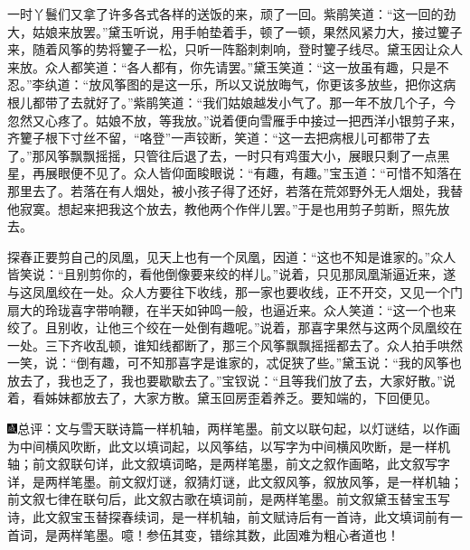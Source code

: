 一时丫鬟们又拿了许多各式各样的送饭的来，顽了一回。紫鹃笑道：``这一回的劲大，姑娘来放罢。''黛玉听说，用手帕垫着手，顿了一顿，果然风紧力大，接过籰子来，随着风筝的势将籰子一松，只听一阵豁刺刺响，登时籰子线尽。黛玉因让众人来放。众人都笑道：``各人都有，你先请罢。''黛玉笑道：``这一放虽有趣，只是不忍。''李纨道：``放风筝图的是这一乐，所以又说放晦气，你更该多放些，把你这病根儿都带了去就好了。''紫鹃笑道：``我们姑娘越发小气了。那一年不放几个子，今忽然又心疼了。姑娘不放，等我放。''说着便向雪雁手中接过一把西洋小银剪子来，齐籰子根下寸丝不留，``咯登''一声铰断，笑道：``这一去把病根儿可都带了去了。''那风筝飘飘摇摇，只管往后退了去，一时只有鸡蛋大小，展眼只剩了一点黑星，再展眼便不见了。众人皆仰面睃眼说：``有趣，有趣。''宝玉道：``可惜不知落在那里去了。若落在有人烟处，被小孩子得了还好，若落在荒郊野外无人烟处，我替他寂寞。想起来把我这个放去，教他两个作伴儿罢。''于是也用剪子剪断，照先放去。

探春正要剪自己的凤凰，见天上也有一个凤凰，因道：``这也不知是谁家的。''众人皆笑说：``且别剪你的，看他倒像要来绞的样儿。''说着，只见那凤凰渐逼近来，遂与这凤凰绞在一处。众人方要往下收线，那一家也要收线，正不开交，又见一个门扇大的玲珑喜字带响鞭，在半天如钟鸣一般，也逼近来。众人笑道：``这一个也来绞了。且别收，让他三个绞在一处倒有趣呢。''说着，那喜字果然与这两个凤凰绞在一处。三下齐收乱顿，谁知线都断了，那三个风筝飘飘摇摇都去了。众人拍手哄然一笑，说：``倒有趣，可不知那喜字是谁家的，忒促狭了些。''黛玉说：``我的风筝也放去了，我也乏了，我也要歇歇去了。''宝钗说：``且等我们放了去，大家好散。''说着，看姊妹都放去了，大家方散。黛玉回房歪着养乏。要知端的，下回便见。

{\includegraphics[width=3mm]{../Images/00005}\kaishu 总评：文与雪天联诗篇一样机轴，两样笔墨。前文以联句起，以灯谜结，以作画为中间横风吹断，此文以填词起，以风筝结，以写字为中间横风吹断，是一样机轴；前文叙联句详，此文叙填词略，是两样笔墨，前文之叙作画略，此文叙写字详，是两样笔墨。前文叙灯谜，叙猜灯谜，此文叙风筝，叙放风筝，是一样机轴；前文叙七律在联句后，此文叙古歌在填词前，是两样笔墨。前文叙黛玉替宝玉写诗，此文叙宝玉替探春续词，是一样机轴，前文赋诗后有一首诗，此文填词前有一首词，是两样笔墨。噫！参伍其变，错综其数，此固难为粗心者道也！}
